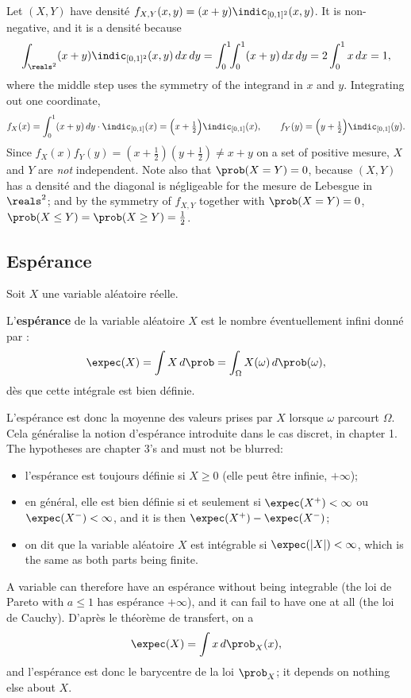\begin{example}
  Let $(X,Y)$ have densité
  $f_{X,Y}(x,y) = (x+y)\indic_{[0,1]^{2}}(x,y)$.
  It is non-negative, and it is a densité because
  \[
    \int_{\reals^{2}} (x+y)\indic_{[0,1]^{2}}(x,y)\,dx\,dy
    = \int_{0}^{1}\!\!\int_{0}^{1} (x+y)\,dx\,dy
    = 2\int_{0}^{1} x\,dx = 1 ,
  \]
  where the middle step uses the symmetry of the integrand in $x$ and $y$.
  Integrating out one coordinate,
  \[
    f_{X}(x) = \int_{0}^{1} (x+y)\,dy \cdot \indic_{[0,1]}(x)
             = \Big(x+\tfrac12\Big)\indic_{[0,1]}(x),
    \qquad
    f_{Y}(y) = \Big(y+\tfrac12\Big)\indic_{[0,1]}(y).
  \]
  Since $f_{X}(x)f_{Y}(y) = (x+\tfrac12)(y+\tfrac12) \neq x+y$ on a set of
  positive mesure, $X$ and $Y$ are \emph{not} independent. Note also that
  $\prob(X=Y)=0$, because $(X,Y)$ has a densité and the diagonal is négligeable
  for the mesure de Lebesgue in $\reals^{2}$; and by the symmetry of $f_{X,Y}$
  together with $\prob(X=Y)=0$, $\prob(X \leq Y) = \prob(X \geq Y) = \tfrac12$.
\end{example}

\subsection{Espérance}

Soit $X$ une variable aléatoire réelle.

\begin{definition}[Espérance]
  L'\textbf{espérance} de la variable aléatoire $X$ est le nombre éventuellement
  infini donné par :
  \[
    \expec(X) = \int X \,d\prob = \int_{\Omega} X(\omega)\,d\prob(\omega),
  \]
  dès que cette intégrale est bien définie.
\end{definition}

L'espérance est donc la moyenne des valeurs prises par $X$ lorsque $\omega$
parcourt $\Omega$. Cela généralise la notion d'espérance introduite dans le cas
discret, in chapter 1. The hypotheses are chapter 3's and must not be blurred:
\begin{itemize}
  \item l'espérance est toujours définie si $X \geq 0$ (elle peut être infinie,
    $+\infty$);
  \item en général, elle est bien définie si et seulement si
    $\expec(X^{+}) < \infty$ ou $\expec(X^{-}) < \infty$, and it is then
    $\expec(X^{+}) - \expec(X^{-})$;
  \item on dit que la variable aléatoire $X$ est intégrable si
    $\expec(|X|) < \infty$, which is the same as both parts being finite.
\end{itemize}
A variable can therefore have an espérance without being integrable (the loi de
Pareto with $a \leq 1$ has espérance $+\infty$), and it can fail to have one at all
(the loi de Cauchy). D'après le théorème de transfert, on a
\[
  \expec(X) = \int x \, d\prob_{X}(x) ,
\]
and l'espérance est donc le barycentre de la loi $\prob_{X}$; it depends on
nothing else about $X$.

